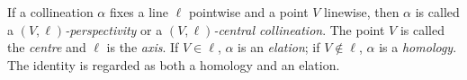 If a collineation $\alpha$ fixes a line $\ell$ pointwise and a point $V$ linewise, then $\alpha$ is called a \emph{$(V,\ell)$-perspectivity} or a \emph{$(V,\ell)$-central collineation}. The point $V$ is called the \emph{centre} and $\ell$ is the \emph{axis}. If $V \in \ell$, $\alpha$ is an \emph{elation}; if $V \notin \ell$, $\alpha$ is a \emph{homology}. The identity is regarded as both a homology and an elation.

